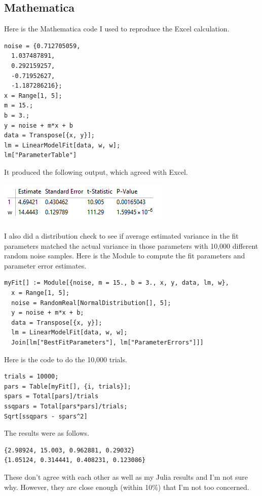 \documentclass{scrartcl}
\begin{document}
\subsection{Mathematica}
Here is the Mathematica code I used to reproduce the Excel
calculation.
\begin{lstlisting}
noise = {0.712705059,
  1.037487891,
  0.292159257,
  -0.71952627,
  -1.187286216};
x = Range[1, 5];
m = 15.;
b = 3.;
y = noise + m*x + b
data = Transpose[{x, y}];
lm = LinearModelFit[data, w, w];
lm["ParameterTable"]
\end{lstlisting}
It produced the following output, which agreed with Excel.

\includegraphics{mathout}

I also did a distribution check to see if average estimated
variance in the fit parameters matched the actual variance 
in those parameters with 10,000 different random noise
samples. Here is the Module to compute the fit parameters
and parameter error estimates.
\begin{lstlisting}
myFit[] := Module[{noise, m = 15., b = 3., x, y, data, lm, w},
  x = Range[1, 5];
  noise = RandomReal[NormalDistribution[], 5];
  y = noise + m*x + b;
  data = Transpose[{x, y}];
  lm = LinearModelFit[data, w, w];
  Join[lm["BestFitParameters"], lm["ParameterErrors"]]]
\end{lstlisting}
Here is the code to do the 10,000 trials.
\begin{lstlisting}
trials = 10000;
pars = Table[myFit[], {i, trials}];
spars = Total[pars]/trials
ssqpars = Total[pars*pars]/trials;
Sqrt[ssqpars - spars^2]
\end{lstlisting}
The results were as follows.
\begin{lstlisting}
{2.98924, 15.003, 0.962881, 0.29032}
{1.05124, 0.314441, 0.408231, 0.123086}
\end{lstlisting}
These don't agree with each other as well as my Julia results
and I'm not sure why. However, they are close enough (within 10\%)
that I'm not too concerned.
\end{document}
